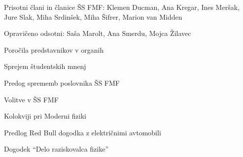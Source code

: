 \documentclass{seja}
\begin{document}
Prisotni člani in članice ŠS FMF: Klemen Ducman, Ana Kregar, Ines Meršak, Jure
Slak, Miha Srdinšek, Miha Šifrer, Marion van Midden

Opravičeno odsotni: Saša Marolt, Ana Smerdu, Mojca Žilavec

\begin{red*}
\item Poročila predstavnikov v organih
\item Sprejem študentskih mnenj
\item Predog sprememb poslovnika ŠS FMF
\item Volitve v ŠS FMF
\item Kolokviji pri Moderni fiziki
\item Predlog Red Bull dogodka z električnimi avtomobili
\item Dogodek ``Delo raziskovalca fizike''
\end{red*}
\end{document}
